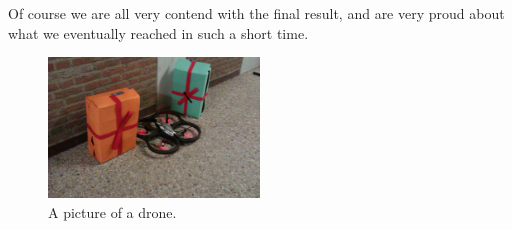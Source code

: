 \documentclass[a4paper,10pt]{article}
\begin{document}
Of course we are all very contend with the final result, and are very proud about what we eventually reached in such a short time. 

\begin{figure}[h!]
	\caption{A picture of a drone.}
	\centering
	\includegraphics[width=0.5\textwidth]{images/presentsAndDrone}
\end{figure}


\end{document}
